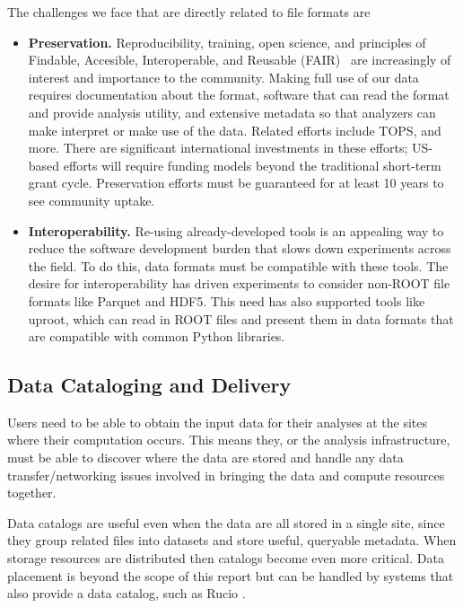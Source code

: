 The challenges we face that are directly related to file formats are

\begin{itemize}
  \item \textbf{Preservation.}  Reproducibility, training, open science, and principles of Findable, Accesible, Interoperable, and Reusable (FAIR)~\cite{Wilkinson2016} are increasingly of interest and importance to the community.  Making full use of our data requires documentation about the format, software that can read the format and provide analysis utility, and extensive metadata so that analyzers can make interpret or make use of the data.  Related efforts include TOPS, and more.  There are significant international investments in these efforts; US-based efforts will require funding models beyond the traditional short-term grant cycle.  Preservation efforts must be guaranteed for at least 10 years to see community uptake.
  \item \textbf{Interoperability.} Re-using already-developed tools is an appealing way to reduce the software development burden that slows down experiments across the field.  To do this, data formats must be compatible with these tools.  The desire for interoperability has driven experiments to consider non-ROOT file formats like Parquet and HDF5.  This need has also supported tools like uproot, which can read in ROOT files and present them in data formats that are compatible with common Python libraries.
\end{itemize} 


\subsection{Data Cataloging and Delivery}

Users need to be able to obtain the input data for their analyses at the sites where their computation occurs. This means they, or the analysis infrastructure, must be able to discover where the data are stored and handle any data transfer/networking issues involved in bringing the data and compute resources together.

Data catalogs are useful even when the data are all stored in a single site, since they group related files into datasets and store useful, queryable metadata. When storage resources are distributed then catalogs become even more critical. Data placement is beyond the scope of this report but can be handled by systems that also provide a data catalog, such as Rucio \cite{Barisits:2019fyl}.

